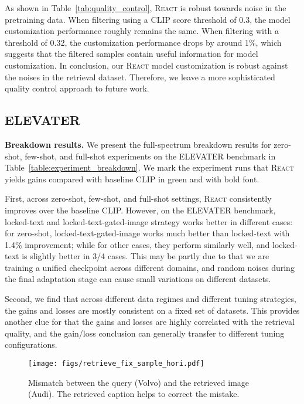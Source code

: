 \documentclass[10pt,twocolumn,letterpaper]{article}
\renewcommand{\paragraph}[1]{\vspace{1.25mm}\noindent\textbf{#1}}
\newcommand{\shortname}{\textsc{React}}
\begin{document}
As shown in Table~\ref{tab:quality_control}, \shortname{} is robust towards noise in the pretraining data. When filtering using a CLIP score threshold of 0.3, the model customization performance roughly remains the same.  When filtering with a threshold of 0.32, the customization performance drops by around 1\%, which suggests that the filtered samples contain useful information for model customization.
In conclusion, our \shortname{} model customization is robust against the noises in the retrieval dataset.  Therefore, we leave a more sophisticated quality control approach to future work.

\subsection{ELEVATER}

\label{sec:more_results_elevater}

\paragraph{Breakdown results.}
We present the full-spectrum breakdown results for zero-shot, few-shot, and full-shot experiments on the ELEVATER benchmark in Table~\ref{table:experiment_breakdown}.  We mark the experiment runs that \shortname{} yields gains compared with baseline CLIP in green and with bold font.

First, across zero-shot, few-shot, and full-shot settings, \shortname{} consistently improves over the baseline CLIP.  However, on the ELEVATER benchmark, locked-text and locked-text-gated-image strategy works better in different cases: for zero-shot, locked-text-gated-image works much better than locked-text with 1.4\% improvement; while for other cases, they perform similarly well, and locked-text is slightly better in 3/4 cases.  This may be partly due to that we are training a unified checkpoint across different domains, and random noises during the final adaptation stage can cause small variations on different datasets.

Second, we find that across different data regimes and different tuning strategies, the gains and losses are mostly consistent on a fixed set of datasets.  This provides another clue for that the gains and losses are highly correlated with the retrieval quality, and the gain/loss conclusion can generally transfer to different tuning configurations.

\begin{figure}[t]
	\centering
	\texttt{[image: figs/retrieve\_fix\_sample\_hori.pdf]}
    \caption{Mismatch between the query (Volvo) and the retrieved image (Audi).  The retrieved caption helps to correct the mistake.}
    \label{fig:example_retrieve_correct_mistake}
\end{figure}
\end{document}
